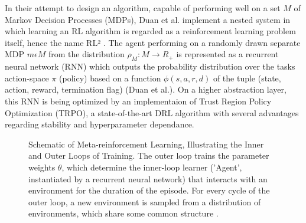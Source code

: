 \documentclass[letterpaper, 10 pt, conference]{ieeeconf}  %
\begin{document}
In their attempt to design an algorithm, capable of performing well on a set $M$ of Markov Decision Processes (MDPs), Duan et al. implement a nested
system in which learning an RL algorithm is regarded as a reinforcement learning problem itself, hence the name RL² 
\cite{duanRLFastReinforcement2016}. The agent performing 
on a randomly drawn separate MDP $m \epsilon M$ from the distribution $\rho_{M} : M \longrightarrow R_{+}$ is represented as a recurrent neural
network (RNN) which outputs the probability distribution over the tasks action-space $\pi$ (policy) based on a function $\phi (s,a,r,d)$ of 
the tuple (state, action, reward, termination flag) (Duan et al.). On a higher abstraction layer, this RNN is being 
optimized by an implementaion of Trust Region Policy Optimization (TRPO), a 
state-of-the-art DRL algorithm \cite{schulmanTrustRegionPolicy2015} with several advantages regarding stability
 and hyperparameter dependance.\newline

\begin{figure}[thpb]
        \centering
  \caption{Schematic of Meta-reinforcement Learning, Illustrating the Inner and Outer Loops of Training. The
  outer loop trains the parameter weights $\theta$, which determine the inner-loop learner (’Agent’, instantiated by a recurrent
  neural network) that interacts with an environment for the duration of the episode. For every cycle of the outer loop, a new
  environment is sampled from a distribution of environments, which share some common structure \cite{botvinickReinforcementLearningFast2019}.}
        \label{figurelabel}
     \end{figure}
\end{document}
